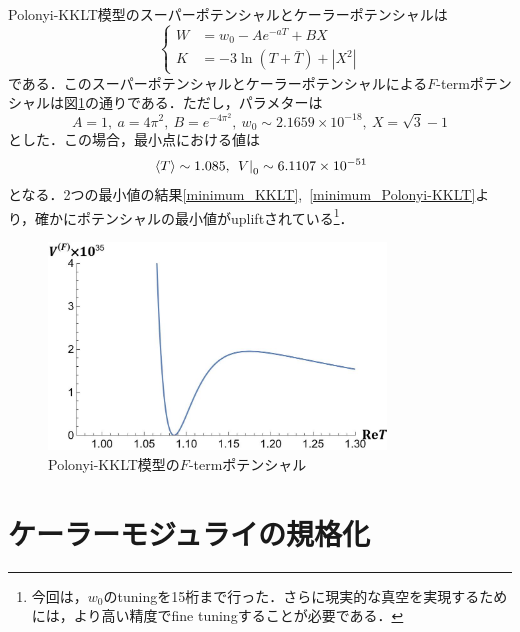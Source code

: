 \documentclass[a4paper,uplatex,dvipdfmx,10pt]{jsarticle}
\theoremstyle{definition}
\begin{document}
Polonyi-KKLT模型のスーパーポテンシャルとケーラーポテンシャルは
\begin{equation}
   \left\{
      \begin{alignedat}{1}
         W
         &=
         w_{0}
         -
         Ae^{-aT}
         +
         BX
         \\
         K
         &=
         -
         3\ln(T+\bar{T})
         +
         |X^2|
      \end{alignedat}
   \right.
   \nonumber
\end{equation}
である．このスーパーポテンシャルとケーラーポテンシャルによる$F$-termポテンシャルは図\ref{plot_Polonyi-KKLT_model}の通りである．ただし，パラメターは
\begin{equation}
   A=1
   ,\ 
   a=4 \pi^2
   ,\ 
   B=e^{-4\pi^2}
   ,\ 
   w_{0}
   \sim
   2.1659
   \times
   10^{-18}
   ,\ 
   X
   =
   \sqrt{3}-1
   \nonumber
\end{equation}
とした．この場合，最小点における値は
\begin{equation}
   \ev*{T}
   \sim
   1.085
   ,\ 
   \left.V\right|_{0}
   \sim
   6.1107\times 10^{-51}
   \label{minimum_Polonyi-KKLT}
\end{equation}
となる．2つの最小値の結果\eqref{minimum_KKLT},\ \eqref{minimum_Polonyi-KKLT}より，確かにポテンシャルの最小値がupliftされている\footnote{
   今回は，$w_{0}$のtuningを15桁まで行った．さらに現実的な真空を実現するためには，より高い精度でfine tuningすることが必要である．
}．

\begin{figure}[ht]
   \centering
   \includegraphics[width=0.8\textwidth]{fig/aaaa.jpg}
   \caption{Polonyi-KKLT模型の$F$-termポテンシャル}
   \label{plot_Polonyi-KKLT_model}
\end{figure}


\section{ケーラーモジュライの規格化}
\label{kahler_moduli_normalize}
\end{document}
